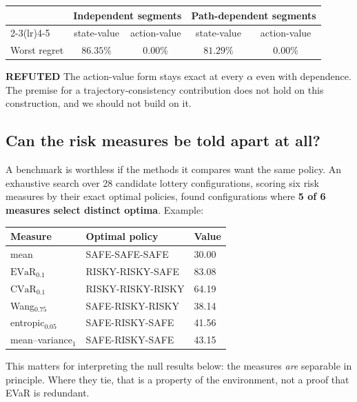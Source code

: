 \documentclass[11pt,a4paper]{article}
\newcommand{\refuted}{\textcolor{soft}{\textbf{REFUTED}}}
\newcommand{\evar}{\mathrm{EVaR}}
\newcommand{\cvar}{\mathrm{CVaR}}
\begin{document}
\begin{center}
\small
\begin{tabular}{@{}lcccc@{}}
\toprule
& \multicolumn{2}{c}{\textbf{Independent segments}} & \multicolumn{2}{c}{\textbf{Path-dependent segments}} \\
\cmidrule(lr){2-3}\cmidrule(lr){4-5}
& state-value & action-value & state-value & action-value \\
\midrule
Worst regret & $86.35\%$ & $\mathbf{0.00\%}$ & $81.29\%$ & $\mathbf{0.00\%}$ \\
\bottomrule
\end{tabular}
\end{center}

\noindent\refuted{} The action-value form stays exact at every $\alpha$ even with
dependence. The premise for a trajectory-consistency contribution does not hold on
this construction, and we should not build on it.

\subsection{Can the risk measures be told apart at all?}

A benchmark is worthless if the methods it compares want the same policy. An
exhaustive search over 28 candidate lottery configurations, scoring six risk
measures by their exact optimal policies, found configurations where \textbf{5 of 6
measures select distinct optima}. Example:

\begin{center}
\small
\begin{tabular}{@{}lll@{}}
\toprule
\textbf{Measure} & \textbf{Optimal policy} & \textbf{Value} \\
\midrule
mean & SAFE-SAFE-SAFE & 30.00 \\
$\evar_{0.1}$ & RISKY-RISKY-SAFE & 83.08 \\
$\cvar_{0.1}$ & RISKY-RISKY-RISKY & 64.19 \\
Wang$_{0.75}$ & SAFE-RISKY-RISKY & 38.14 \\
entropic$_{0.05}$ & SAFE-RISKY-SAFE & 41.56 \\
mean--variance$_{1}$ & SAFE-RISKY-SAFE & 43.15 \\
\bottomrule
\end{tabular}
\end{center}

\noindent This matters for interpreting the null results below: the measures
\emph{are} separable in principle. Where they tie, that is a property of the
environment, not a proof that EVaR is redundant.
\end{document}
